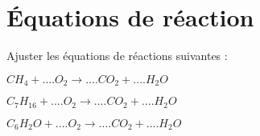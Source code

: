 \section{\'Equations de réaction}

Ajuster les équations de réactions suivantes :
\begin{questions}
	\question $CH_4 + ....O_2 \rightarrow ....CO_2 + ....H_2O$
	
	\question $C_7H_{16} + ....O_2 \rightarrow ....CO_2 + ....H_2O$	
	
	\question $C_6H_{2}O + ....O_2 \rightarrow ....CO_2 + ....H_2O$
\end{questions}
